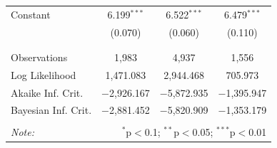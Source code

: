 \documentclass[letterpaper,12pt]{article}\usepackage[]{graphicx}\usepackage[]{color}
\begin{document}
\begin{table}[!htbp]
\begin{tabular}{@{\extracolsep{5pt}}lccc}
 Constant & 6.199$^{***}$ & 6.522$^{***}$ & 6.479$^{***}$ \\ 
  & (0.070) & (0.060) & (0.110) \\ 
  & & & \\ 
\hline \\[-1.8ex] 
Observations & 1,983 & 4,937 & 1,556 \\ 
Log Likelihood & 1,471.083 & 2,944.468 & 705.973 \\ 
Akaike Inf. Crit. & $-$2,926.167 & $-$5,872.935 & $-$1,395.947 \\ 
Bayesian Inf. Crit. & $-$2,881.452 & $-$5,820.909 & $-$1,353.179 \\ 
\hline 
\hline \\[-1.8ex] 
\textit{Note:}  & \multicolumn{3}{r}{$^{*}$p$<$0.1; $^{**}$p$<$0.05; $^{***}$p$<$0.01} \\ 
\end{tabular} 
\end{table} 

\clearpage
\end{document}
